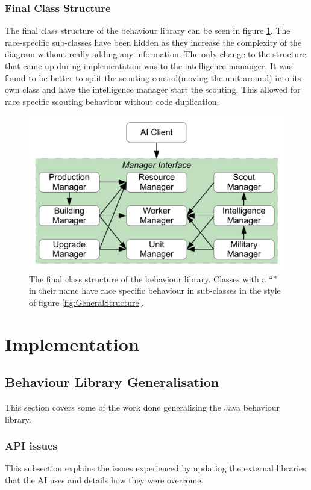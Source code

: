 \documentclass[11pt,openright,a4paper]{report}
\begin{document}
\subsection{Final Class Structure}
The final class structure of the behaviour library can be seen in figure \ref{fig:ClassDia}. The race-specific sub-classes have been hidden as they increase the complexity of the diagram without really adding any information. The only change to the structure that came up during implementation was to the intelligence mananger. It was found to be better to split the scouting control(moving the unit around) into its own class and have the intelligence manager start the scouting. This allowed for race specific scouting behaviour without code duplication.
\begin{figure}[h]
    \centering
    \includegraphics[scale=0.5]{ClassDia}
    \caption{The final class structure of the behaviour library. Classes with a ``\lbrack*\rbrack'' in their name have race specific behaviour in sub-classes in the style of figure \ref{fig:GeneralStructure}.}
    \label{fig:ClassDia}
\end{figure}

\chapter{Implementation}
\label{Implementation}

\section{Behaviour Library Generalisation}
This section covers some of the work done generalising the Java behaviour library.
\subsection{API issues}
This subsection explains the issues experienced by updating the external libraries that the AI uses and details how they were overcome.
\end{document}
